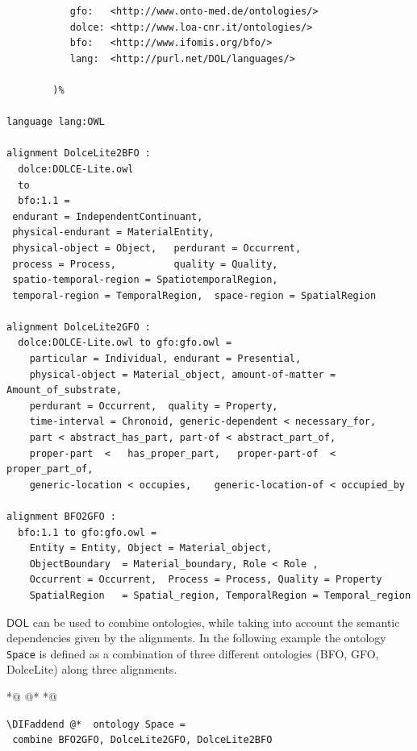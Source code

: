 \documentclass[10pt,fleqn,final]{scrreprt}
\newcommand*{\DOL}{\ensuremath{\mathsf{DOL}}\xspace}
\newenvironment{definitions}[0]{\medskip }{}
\providecommand{\DIFaddbegin}{} %
\providecommand{\DIFaddend}{} %
\providecommand{\DIFdelbegin}{} %
\providecommand{\DIFdelend}{} %
\begin{document}
\begin{definitions}
\begin{lstlisting}[basicstyle=\ttfamily\footnotesize,language=dolText,escapechar=@,mathescape]
%prefix(
           gfo:   <http://www.onto-med.de/ontologies/>
           dolce: <http://www.loa-cnr.it/ontologies/>
           bfo:   <http://www.ifomis.org/bfo/>
           lang:  <http://purl.net/DOL/languages/>

        )%

language lang:OWL

alignment DolceLite2BFO :
  dolce:DOLCE-Lite.owl
  to
  bfo:1.1 =
 endurant = IndependentContinuant,
 physical-endurant = MaterialEntity,
 physical-object = Object,   perdurant = Occurrent,
 process = Process,          quality = Quality,
 spatio-temporal-region = SpatiotemporalRegion,
 temporal-region = TemporalRegion,  space-region = SpatialRegion

alignment DolceLite2GFO :
  dolce:DOLCE-Lite.owl to gfo:gfo.owl =
 	particular = Individual, endurant = Presential,
 	physical-object = Material_object, amount-of-matter = Amount_of_substrate,
 	perdurant = Occurrent, 	quality = Property,
 	time-interval = Chronoid, generic-dependent < necessary_for,
 	part < abstract_has_part, part-of < abstract_part_of,
 	proper-part  <	 has_proper_part,  	proper-part-of  < proper_part_of,
 	generic-location < occupies, 	generic-location-of < occupied_by

alignment BFO2GFO :
  bfo:1.1 to gfo:gfo.owl =
	Entity = Entity, Object = Material_object,
	ObjectBoundary  = Material_boundary, Role < Role ,
 	Occurrent = Occurrent, 	Process = Process, Quality = Property 
 	SpatialRegion 	= Spatial_region, TemporalRegion = Temporal_region 	
\end{lstlisting}


 \DOL can be used to combine ontologies, while taking into account the semantic dependencies given by the alignments. In the following example the ontology \lstinline{Space} is defined as a combination of three different ontologies (BFO, GFO, DolceLite) along three alignments. 

 *@ \DIFdelbegin %
\DIFdelend @*   *@ \DIFaddbegin \begin{lstlisting}[basicstyle=\ttfamily\footnotesize,language=dolText,escapechar=@,mathescape]
\DIFaddend @*  ontology Space =
 combine BFO2GFO, DolceLite2GFO, DolceLite2BFO
\end{lstlisting} 


\end{definitions}
\end{document}
